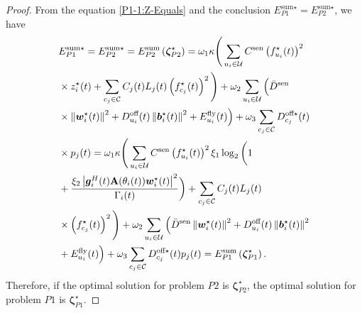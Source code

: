 \documentclass[10pt,journal,compsoc]{IEEEtran}
\newtheorem*{proof}{Proof}
\begin{document}
\begin{proof}
    From the equation \eqref{P1-1:Z-Equals} and the conclusion ${E}_{P1}^{\text{sum} \star} = {E}_{P2}^{\text{sum} \star}$, we have 
    \begin{align}\label{Proof:P1-P2-Same-Solution}
        &{E}_{P1}^{\text{sum} \star} = {E}_{P2}^{\text{sum} \star} = {E}_{P2}^{\text{sum}}\left({\bm{\zeta}}^{\star}_{P2}\right) = \omega_{1}\kappa \Bigg(\sum_{u_{i} \in \mathcal{U}} C^{\text{sen}} \left({f}^{\star}_{u_{i}}(t)\right)^{2} \notag \\
        & \times {z}^{\star}_{i}(t) + \sum_{c_{j} \in \mathcal{C}} C_{{j}}(t)L_{j}(t)\left({f}^{\star}_{c_{j}}(t)\right)^{2} \Bigg) + \omega_{2}\sum_{u_{i} \in \mathcal{U}} \Big(\bar{D}^{\text{sen}} \notag \\
        & \times \left\|{\bm{w}}^{\star}_{i}(t)\right\|^{2} + D_{u_{i}}^{\text{off}}(t)\left\|{\bm{b}}^{\star}_{i}(t)\right\|^{2} + E_{u_{i}}^{\text{fly}}(t)\Big) + \omega_{3}\sum_{c_{j} \in \mathcal{C}}{D}_{c_{j}}^{\text{off} \star}(t) \notag \\
        & \times p_{j}(t) = \omega_{1}\kappa \Bigg(\sum_{u_{i} \in \mathcal{U}} C^{\text{sen}} \left({f}^{\star}_{u_{i}}(t)\right)^{2} \xi_{1} \log_2 \bigg(1 \notag \\
        & + \frac{\xi_{2} \left|\bm{g}^{H}_{i}(t)\mathbf{A}(\theta_{i}(t)) \bm{w}^{\star}_{i}(t)\right|^{2}}{\Gamma_{i}(t)}\bigg) + \sum_{c_{j} \in \mathcal{C}} C_{{j}}(t)L_{j}(t) \notag \\
        & \times \left({f}^{\star}_{c_{j}}(t)\right)^{2} \Bigg) + \omega_{2}\sum_{u_{i} \in \mathcal{U}} \Big(\bar{D}^{\text{sen}}\left\|{\bm{w}}^{\star}_{i}(t)\right\|^{2} + D_{u_{i}}^{\text{off}}(t) \left\|{\bm{b}}^{\star}_{i}(t)\right\|^{2} \notag \\
        & + E_{u_{i}}^{\text{fly}}(t)\Big) + \omega_{3}\sum_{c_{j} \in \mathcal{C}}{D}_{c_{j}}^{\text{off} \star}(t)p_{j}(t) = {E}_{P1}^{\text{sum}}\left({\bm{\zeta}}^{\star}_{P1}\right).
    \end{align}
    Therefore, if the optimal solution for problem $P2$ is ${\bm{\zeta}}^{\star}_{P2}$, the optimal solution for problem $P1$ is ${\bm{\zeta}}^{\star}_{P1}$.
\end{proof}
\end{document}
